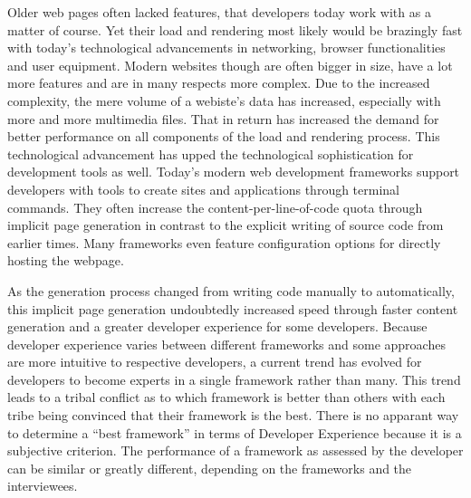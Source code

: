 \documentclass[a4paper, 10pt]{article}
\begin{document}
Older web pages often lacked features, that developers today work with as a matter of course.
Yet their load and rendering most likely would be brazingly fast with today's technological advancements in networking, browser functionalities and user equipment.
Modern websites though are often bigger in size, have a lot more features and are in many respects more complex.
Due to the increased complexity, the mere volume of a webiste's data has increased, especially with more and more multimedia files.
That in return has increased the demand for better performance on all components of the load and rendering process.
This technological advancement has upped the technological sophistication for development tools as well.
Today's modern web development frameworks support developers with tools to create sites and applications through terminal commands.
They often increase the content-per-line-of-code quota through implicit page generation in contrast to the explicit writing of source code from earlier times.
Many frameworks even feature configuration options for directly hosting the webpage.

As the generation process changed from writing code manually to automatically, this implicit page generation undoubtedly increased speed through faster content generation and a greater developer experience for some developers.
Because developer experience varies between different frameworks and some approaches are more intuitive to respective developers, a current trend has evolved for developers to become experts in a single framework rather than many.
This trend leads to a tribal conflict as to which framework is better than others with each tribe being convinced that their framework is the best.
There is no apparant way to determine a \enquote{best framework} in terms of Developer Experience because it is a subjective criterion.
The performance of a framework as assessed by the developer can be similar or greatly different, depending on the frameworks and the interviewees.
\end{document}
